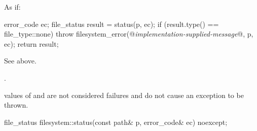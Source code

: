 \begin{itemdescr}
\pnum
\effects
As if:
\begin{codeblock}
error_code ec;
file_status result = status(p, ec);
if (result.type() == file_type::none)
  throw filesystem_error(@\textit{implementation-supplied-message}@, p, ec);
return result;
\end{codeblock}

\pnum
\returns
See above.

\pnum
\throws
{}.
\begin{note}
 values of 
  and  are not considered failures and do not
  cause an exception to be thrown.
\end{note}
\end{itemdescr}

%
\begin{itemdecl}
file_status filesystem::status(const path& p, error_code& ec) noexcept;
\end{itemdecl}

